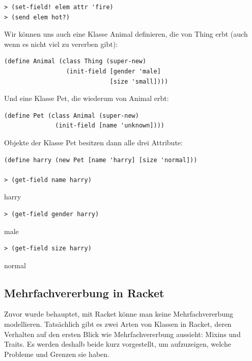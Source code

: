 \begin{lstlisting}
> (set-field! elem attr 'fire)
> (send elem hot?)
\end{lstlisting} 
{}
% 
% 

Wir können uns auch eine Klasse Animal definieren, die von Thing erbt (auch wenn es nicht viel zu vererben gibt):

\begin{lstlisting}
(define Animal (class Thing (super-new)
                 (init-field [gender 'male]
                             [size 'small])))
\end{lstlisting} 

Und eine Klasse Pet, die wiederum von Animal erbt:

\begin{lstlisting}
(define Pet (class Animal (super-new)
              (init-field [name 'unknown])))
\end{lstlisting} 

Objekte der Klasse Pet besitzen dann alle drei Attribute:

\begin{lstlisting}
(define harry (new Pet [name 'harry] [size 'normal]))

> (get-field name harry)
\end{lstlisting} 
{\rsymbol harry}

\begin{lstlisting}
> (get-field gender harry)
\end{lstlisting} 
{\rsymbol male}

\begin{lstlisting}
> (get-field size harry)
\end{lstlisting} 
{\rsymbol normal}


\subsection{Mehrfachvererbung in Racket}
Zuvor wurde behauptet, mit Racket könne man keine Mehrfachvererbung modellieren. Tatsächlich gibt es zwei Arten von Klassen in Racket, deren Verhalten auf den ersten Blick wie Mehrfachvererbung aussieht: Mixins und Traits. Es werden deshalb beide kurz vorgestellt, um aufzuzeigen, welche Probleme und Grenzen sie haben.

